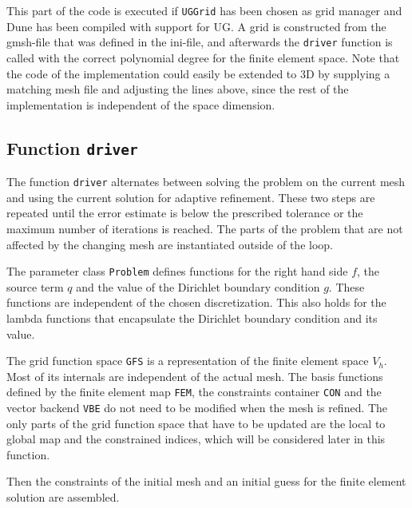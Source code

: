 \documentclass[a4paper,12pt]{article}
\begin{document}

This part of the code is executed if \lstinline{UGGrid} has been chosen as grid manager
and Dune has been compiled with support for UG. A grid is constructed from the gmsh-file that
was defined in the ini-file, and afterwards the \lstinline{driver} function is called
with the correct polynomial degree for the finite element space. Note that the code of
the implementation could easily be extended to 3D by supplying a matching mesh file and
adjusting the lines above, since the rest of the implementation is independent of the
space dimension.

\subsection{Function \lstinline{driver}}

The function \lstinline{driver} alternates between solving the problem on the current mesh
and using the current solution for adaptive refinement. These two steps are repeated until
the error estimate is below the prescribed tolerance or the maximum number of iterations is
reached. The parts of the problem that are not affected by the changing mesh are instantiated
outside of the loop.


The parameter class \lstinline{Problem} defines functions for the right hand side
$f$, the source term $q$ and the value of the Dirichlet boundary condition $g$. These
functions are independent of the chosen discretization. This also holds for the lambda
functions that encapsulate the Dirichlet boundary condition and its value.


The grid function space \lstinline{GFS} is a representation of the finite element space
$V_h$. Most of its internals are independent of the actual mesh. The basis functions defined
by the finite element map \lstinline{FEM}, the constraints container \lstinline{CON} and the
vector backend \lstinline{VBE} do not need to be modified when the mesh is refined. The only
parts of the grid function space that have to be updated are the local to global map and the
constrained indices, which will be considered later in this function.


Then the constraints of the initial mesh and an initial guess for the finite element solution
are assembled.
\end{document}
